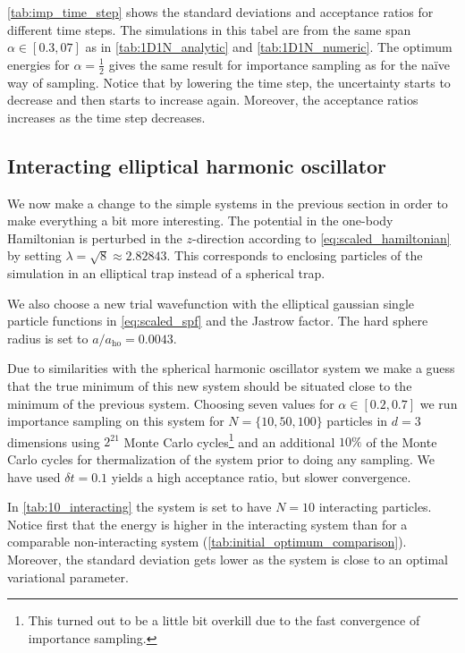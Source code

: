 \documentclass[
    a4paper, aps, twocolumn, floatfix, superscriptaddress,
    nofootinbib]{revtex4-1}
\newcommand{\1}{\mathds{1}}
\begin{document}
            \autoref{tab:imp_time_step} shows the standard deviations and
            acceptance ratios for different time steps. The simulations in this
            tabel are from the same span $\alpha \in [0.3, 07]$ as in
            \autoref{tab:1D1N_analytic} and \autoref{tab:1D1N_numeric}. The
            optimum energies for $\alpha = \frac{1}{2}$ gives the same result
            for importance sampling as for the naïve way of sampling. Notice
            that by lowering the time step, the uncertainty starts to decrease
            and then starts to increase again. Moreover, the acceptance ratios
            increases as the time step decreases.

    \subsection{Interacting elliptical harmonic oscillator}
        We now make a change to the simple systems in the previous section in
        order to make everything a bit more interesting. The potential in the
        one-body Hamiltonian is perturbed in the $z$-direction according to
        \autoref{eq:scaled_hamiltonian} by setting $\lambda = \sqrt{8} \approx
        2.82843$. This corresponds to enclosing particles of the simulation in
        an elliptical trap instead of a spherical trap.

        We also choose a new trial wavefunction with the elliptical gaussian
        single particle functions in \autoref{eq:scaled_spf} and the Jastrow
        factor. The hard sphere radius is set to $a/a_{\text{ho}} = 0.0043$.

        Due to similarities with the spherical harmonic oscillator
        system we make a guess that the true minimum of this new system should
        be situated close to the minimum of the previous system. Choosing seven
        values for $\alpha \in [0.2, 0.7]$ we run importance sampling on this
        system for $N = \{10, 50, 100\}$ particles in $d = 3$ dimensions using
        $2^{21}$ Monte Carlo cycles\footnote{This turned out to be a little bit
        overkill due to the fast convergence of importance sampling.} and an
        additional $10\%$ of the Monte Carlo cycles for thermalization of the
        system prior to doing any sampling. We have used $\delta t = 0.1$ yields
        a high acceptance ratio, but slower convergence.

        In \autoref{tab:10_interacting} the system is set to have $N = 10$
        interacting particles. Notice first that the energy is higher in
        the interacting system than for a comparable non-interacting system
        (\autoref{tab:initial_optimum_comparison}).  Moreover, the standard
        deviation gets lower as the system is close to an optimal variational
        parameter.
\end{document}
